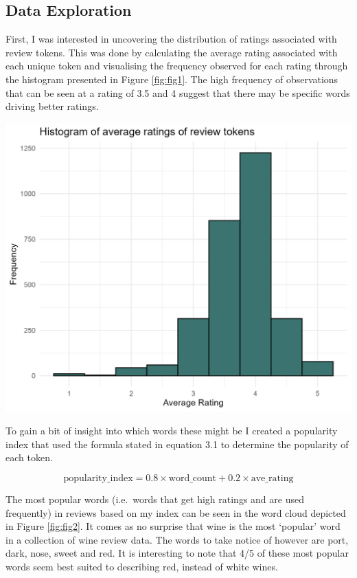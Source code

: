 \documentclass[11pt,preprint]{elsarticle}
\let\origfigure\figure
\let\endorigfigure\endfigure
\renewenvironment{figure}[1][2] {
    \expandafter\origfigure\expandafter[H]
} {
    \endorigfigure
}
\numberwithin{equation}{section}
\numberwithin{figure}{section}
\numberwithin{table}{section}
\begin{document}
\subsection{Data Exploration}\label{data-exploration}

First, I was interested in uncovering the distribution of ratings
associated with review tokens. This was done by calculating the average
rating associated with each unique token and visualising the frequency
observed for each rating through the histogram presented in Figure
\ref{fig:fig1}. The high frequency of observations that can be seen at a
rating of 3.5 and 4 suggest that there may be specific words driving
better ratings.

\begin{figure}[H]

{\centering \includegraphics[width=0.8\linewidth]{writeup/fig1} 

}

\caption{Histogram of average ratings of review tokens\label{fig:fig1}}\label{fig:fig1}
\end{figure}

To gain a bit of insight into which words these might be I created a
popularity index that used the formula stated in equation 3.1 to
determine the popularity of each token.

\begin{equation}
    \text{popularity\_index} = 0.8 \times \text{word\_count} + 0.2 \times \text{ave\_rating}
\end{equation}

The most popular words (i.e.~words that get high ratings and are used
frequently) in reviews based on my index can be seen in the word cloud
depicted in Figure \ref{fig:fig2}. It comes as no surprise that wine is
the most `popular' word in a collection of wine review data. The words
to take notice of however are port, dark, nose, sweet and red. It is
interesting to note that 4/5 of these most popular words seem best
suited to describing red, instead of white wines.
\end{document}
